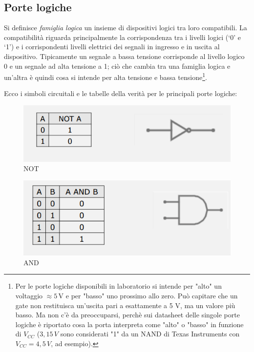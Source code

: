 \documentclass{article}
\begin{document}
\clearpage










\subsection{Porte logiche}

Si definisce \textit{famiglia logica} un insieme di dispositivi logici tra loro compatibili. La compatibilità riguarda principalmente la corrispondenza tra i livelli logici (‘0’ e ‘1’) e i corrispondenti livelli elettrici dei segnali in ingresso e in uscita al dispositivo. Tipicamente un segnale a bassa tensione corrisponde al livello logico 0 e un segnale ad alta tensione a 1; ciò che cambia tra una famiglia logica e un'altra è quindi cosa si intende per alta tensione e bassa tensione\footnote{Per le porte logiche disponibili in laboratorio si intende per "alto" un voltaggio $\approx 5 \, \text{V}$ e per "basso" uno prossimo allo zero. Può capitare che un gate non restituisca un'uscita pari a esattamente a 5 V, ma un valore più basso. Ma non c'è da preoccuparsi, perchè sui datasheet delle singole porte logiche è riportato cosa la porta interpreta come "alto" o "basso" in funzione di $V_{CC}$ ($3,15 \,V$ sono considerati "1" da un NAND di Texas Instruments con $V_{CC}=4,5\,V$, ad esempio).}.

\vspace{1mm}

Ecco i simboli circuitali e le tabelle della verità per le principali porte logiche:

\begin{figure}[h]
  \centering
  \includegraphics[scale=0.7]{IM_NOT}
  \caption{NOT}
  \label{NOT}
\end{figure}

\begin{figure}[h]
  \centering
  \includegraphics[scale=0.7]{IM_AND}
  \caption{AND}
  \label{AND}
\end{figure}
\end{document}
